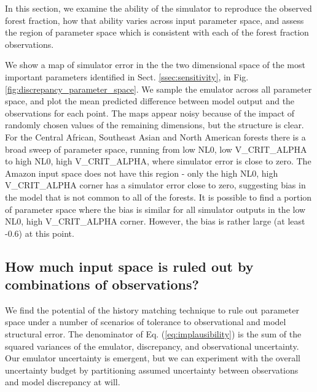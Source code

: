 \documentclass[esd, article]{copernicus} %
\begin{document}
In this section, we examine the ability of the simulator to reproduce the observed forest fraction, how that ability varies across input parameter space, and assess the region of parameter space which is consistent with each of the forest fraction observations.

We show a map of simulator error in the the two dimensional space of the most important parameters identified in Sect. \ref{ssec:sensitivity}, in Fig.  \ref{fig:discrepancy_parameter_space}. We sample the emulator across all parameter space, and plot the mean predicted difference between model output and the observations for each point. The maps appear noisy because of the impact of randomly chosen values of the remaining dimensions, but the structure is clear. For the Central African, Southeast Asian and North American forests there is a broad sweep of parameter space, running from low NL0, low V\_CRIT\_ALPHA to high NL0, high V\_CRIT\_ALPHA, where simulator error is close to zero. The Amazon input space does not have this region - only the high NL0, high V\_CRIT\_ALPHA corner has a simulator error close to zero, suggesting bias in the model that is not common to all of the forests. It is possible to find a portion of parameter space where the bias is similar for all simulator outputs in the low NL0, high V\_CRIT\_ALPHA corner. However, the bias is rather large (at least -0.6) at this point.


\subsection{How much input space is ruled out by combinations of observations?}\label{ssec:combination}
We find the potential of the history matching technique to rule out parameter space under a number of scenarios of tolerance to observational and model structural error. The denominator of Eq. (\ref{eq:implausibility}) is the sum of the squared variances of the emulator, discrepancy, and observational uncertainty. Our emulator uncertainty is emergent, but we can experiment with the overall uncertainty budget by partitioning assumed uncertainty between observations and model discrepancy at will.
\end{document}
